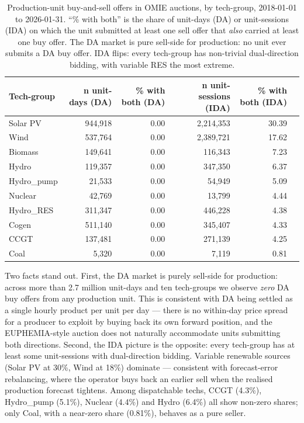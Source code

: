 \documentclass[11pt,a4paper]{article}
\begin{document}
\begin{table}[h]
\centering
\footnotesize
\caption{Production-unit buy-and-sell offers in OMIE auctions, by tech-group, 2018-01-01 to 2026-01-31. ``\% with both'' is the share of unit-days (DA) or unit-sessions (IDA) on which the unit submitted at least one sell offer that \emph{also} carried at least one buy offer. The DA market is pure sell-side for production: no unit ever submits a DA buy offer. IDA flips: every tech-group has non-trivial dual-direction bidding, with variable RES the most extreme.}
\label{tab:arbitrage_units}
\begin{tabular}{l r r r r r}
\toprule
Tech-group & n unit-days (DA) & \% with both (DA) & n unit-sessions (IDA) & \% with both (IDA) \\
\midrule
Solar PV   &   944{,}918 & 0.00 & 2{,}214{,}353 & 30.39 \\
Wind       &   537{,}764 & 0.00 & 2{,}389{,}721 & 17.62 \\
Biomass    &   149{,}641 & 0.00 &   116{,}343 &  7.23 \\
Hydro      &   119{,}357 & 0.00 &   347{,}350 &  6.37 \\
Hydro\_pump &   21{,}533 & 0.00 &    54{,}949 &  5.09 \\
Nuclear    &    42{,}769 & 0.00 &    13{,}799 &  4.44 \\
Hydro\_RES  &  311{,}347 & 0.00 &   446{,}228 &  4.38 \\
Cogen      &   511{,}140 & 0.00 &   345{,}407 &  4.33 \\
CCGT       &   137{,}481 & 0.00 &   271{,}139 &  4.25 \\
Coal       &     5{,}320 & 0.00 &     7{,}119 &  0.81 \\
\bottomrule
\end{tabular}
\end{table}

\noindent Two facts stand out. First, the DA market is purely sell-side for production: across more than 2.7 million unit-days and ten tech-groups we observe \emph{zero} DA buy offers from any production unit. This is consistent with DA being settled as a single hourly product per unit per day --- there is no within-day price spread for a producer to exploit by buying back its own forward position, and the EUPHEMIA-style auction does not naturally accommodate units submitting both directions. Second, the IDA picture is the opposite: every tech-group has at least some unit-sessions with dual-direction bidding. Variable renewable sources (Solar PV at 30\%, Wind at 18\%) dominate --- consistent with forecast-error rebalancing, where the operator buys back an earlier sell when the realised production forecast tightens. Among dispatchable techs, CCGT (4.3\%), Hydro\_pump (5.1\%), Nuclear (4.4\%) and Hydro (6.4\%) all show non-zero shares; only Coal, with a near-zero share (0.81\%), behaves as a pure seller.
\end{document}
